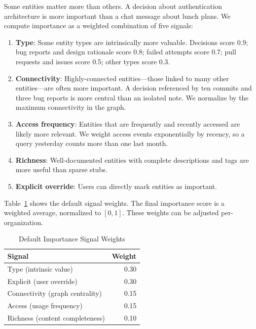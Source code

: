 \documentclass[10pt,journal,compsoc]{IEEEtran}
\begin{document}
Some entities matter more than others. A decision about authentication architecture is more important than a chat message about lunch plans. We compute importance as a weighted combination of five signals:

\begin{enumerate}
\item \textbf{Type}: Some entity types are intrinsically more valuable. Decisions score 0.9; bug reports and design rationale score 0.8; failed attempts score 0.7; pull requests and issues score 0.5; other types score 0.3.

\item \textbf{Connectivity}: Highly-connected entities---those linked to many other entities---are often more important. A decision referenced by ten commits and three bug reports is more central than an isolated note. We normalize by the maximum connectivity in the graph.

\item \textbf{Access frequency}: Entities that are frequently and recently accessed are likely more relevant. We weight access events exponentially by recency, so a query yesterday counts more than one last month.

\item \textbf{Richness}: Well-documented entities with complete descriptions and tags are more useful than sparse stubs.

\item \textbf{Explicit override}: Users can directly mark entities as important.
\end{enumerate}

Table~\ref{tab:weights} shows the default signal weights. The final importance score is a weighted average, normalized to $[0,1]$. These weights can be adjusted per-organization.

\begin{table}[t]
\caption{Default Importance Signal Weights}
\label{tab:weights}
\centering
\small
\renewcommand{\arraystretch}{1.3}
\begin{tabular}{@{}p{} r@{}}
\toprule
\textbf{Signal} & \textbf{Weight} \\
\midrule
Type (intrinsic value) & 0.30 \\
Explicit (user override) & 0.30 \\
Connectivity (graph centrality) & 0.15 \\
Access (usage frequency) & 0.15 \\
Richness (content completeness) & 0.10 \\
\bottomrule
\end{tabular}
\end{table}
\end{document}
